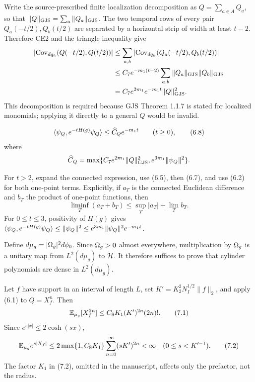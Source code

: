 \documentclass[11pt,a4paper]{article}
\begin{document}
\Because Write the source-prescribed finite localization decomposition as
$Q=\sum_{a\in A}Q_a$, so that
$\|Q\|_{\rm GJS}=\sum_a\|Q_a\|_{\rm GJS}$.  The two temporal rows of every
pair $Q_a(-t/2),Q_b(t/2)$ are separated by a horizontal strip of width at least
$t-2$.  Therefore CE2 and the triangle inequality give
\[
 \begin{split}
 \left|\operatorname{Cov}_{dq_h}(Q(-t/2),Q(t/2))\right|
 &\le\sum_{a,b}\left|\operatorname{Cov}_{dq_h}
       (Q_a(-t/2),Q_b(t/2))\right|\\
 &\le C_7e^{-m_1(t-2)}\sum_{a,b}
       \|Q_a\|_{\rm GJS}\|Q_b\|_{\rm GJS}\\
 &=C_7e^{2m_1}e^{-m_1t}\|Q\|_{\rm GJS}^2.
 \end{split}
\]
This decomposition is required because GJS Theorem 1.1.7 is stated for localized
monomials; applying it directly to a general $Q$ would be invalid.

\[
 \langle \psi_Q,e^{-tH(g)}\psi_Q\rangle
 \leq\widehat C_Qe^{-m_1t}\qquad(t\geq0),                          \tag{6.8}
\]
where
\[
 \widehat C_Q=\max\{C_7e^{2m_1}\|Q\|_{\rm GJS}^2,
                     e^{3m_1}\|\psi_Q\|^2\}.
\]

\Because For $t>2$, expand the connected expression, use (6.5), then (6.7),
and use (6.2) for both one-point terms.  Explicitly, if $a_T$ is the connected
Euclidean difference and $b_T$ the product of one-point functions, then
\[
 \liminf_T(a_T+b_T)\leq\sup_T|a_T|+\lim_Tb_T.
\]
For $0\leq t\leq3$, positivity of $H(g)$ gives
$\langle \psi_Q,e^{-tH(g)}\psi_Q\rangle\leq\|\psi_Q\|^2
\leq e^{3m_1}\|\psi_Q\|^2e^{-m_1t}$.

\QedStep


Define $d\mu_g=|\Omega_g|^2d\phi_0$.  Since $\Omega_g>0$ almost everywhere,
multiplication by $\Omega_g$ is a unitary map from $L^2(d\mu_g)$ to $\mathcal H$.
It therefore suffices to prove that cylinder polynomials are dense in $L^2(d\mu_g)$.


\Because Let $f$ have support in an interval of length $L$, set
$K'=K_2^2N_I^{1/2}\|f\|_2$, and apply (6.1) to $Q=X_f^n$.  Then
\[
 \mathbb E_{\mu_g}[X_f^{2n}]
 \leq C_8K_1(K')^{2n}(2n)!.                                      \tag{7.1}
\]
Since $e^{s|x|}\leq2\cosh(sx)$,
\[
 \mathbb E_{\mu_g}e^{s|X_f|}
 \leq2\max\{1,C_8K_1\}\sum_{n=0}^\infty(sK')^{2n}<\infty
 \quad(0\leq s<K'^{-1}).                                         \tag{7.2}
\]
The factor $K_1$ in (7.2), omitted in the manuscript, affects only the prefactor,
not the radius.
\end{document}
